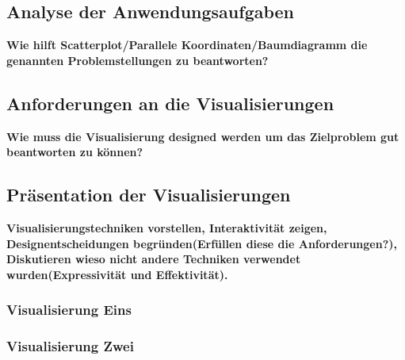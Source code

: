 \documentclass[usegeometry=true]{scrartcl}
\begin{document}
\subsection{Analyse der Anwendungsaufgaben}

\textbf{Wie hilft Scatterplot/Parallele Koordinaten/Baumdiagramm die genannten Problemstellungen zu beantworten?}
\subsection{Anforderungen an die Visualisierungen}
\textbf{Wie muss die Visualisierung designed werden um das Zielproblem gut beantworten zu können?}
\subsection{Präsentation der Visualisierungen}


\textbf{Visualisierungstechniken vorstellen, Interaktivität zeigen, Designentscheidungen begründen(Erfüllen diese die Anforderungen?), Diskutieren wieso nicht andere Techniken verwendet wurden(Expressivität und Effektivität).}
\subsubsection{Visualisierung Eins}
\subsubsection{Visualisierung Zwei}
\end{document}
